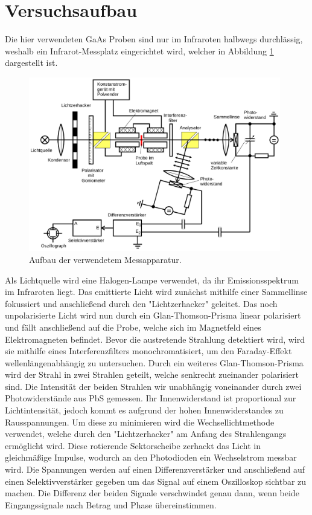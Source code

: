 \section{Versuchsaufbau}

Die hier verwendeten GaAs Proben sind nur im Infraroten halbwegs durchlässig, weshalb ein
Infrarot-Messplatz eingerichtet wird, welcher in Abbildung \ref{fig:aufbau} dargestellt ist.

\begin{figure}[H]
  \centering
  \includegraphics[width=11cm]{Aufbau.png}
  \caption{Aufbau der verwendetem Messapparatur.}
  \label{fig:aufbau}
\end{figure}

Als Lichtquelle wird eine Halogen-Lampe verwendet, da ihr Emissionsspektrum im Infraroten liegt.
Das emittierte Licht wird zunächst mithilfe einer Sammellinse fokussiert und anschließend durch
den "Lichtzerhacker" geleitet. Das noch unpolarisierte Licht wird nun durch ein Glan-Thomson-Prisma
linear polarisiert und fällt anschließend auf die Probe, welche sich im Magnetfeld eines
Elektromagneten befindet.
Bevor die austretende Strahlung detektiert wird, wird sie mithilfe eines Interferenzfilters monochromatisiert,
um den Faraday-Effekt wellenlängenabhängig zu untersuchen. Durch ein weiteres Glan-Thomson-Prisma wird der
Strahl in zwei Strahlen geteilt, welche senkrecht zueinander polarisiert sind. Die Intensität der beiden
Strahlen wir unabhängig voneinander durch zwei Photowiderstände aus PbS gemessen. Ihr Innenwiderstand ist
proportional zur Lichtintensität, jedoch kommt es aufgrund der hohen Innenwiderstandes zu Rausspannungen.
Um diese zu minimieren wird die Wechsellichtmethode verwendet, welche durch den "Lichtzerhacker" am Anfang des
Strahlengangs ermöglicht wird. Diese rotierende Sektorscheibe zerhackt das Licht in gleichmäßige Impulse, wodurch
an den Photodioden ein Wechselstrom messbar wird. Die Spannungen werden auf einen Differenzverstärker und anschließend auf
einen Selektivverstärker gegeben um das Signal auf einem Oszilloskop sichtbar zu machen.
Die Differenz der beiden Signale verschwindet genau dann, wenn beide Eingangssignale nach Betrag und Phase
übereinstimmen.


